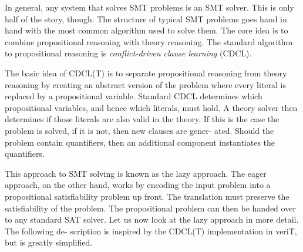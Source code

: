 In general, any system that solves SMT problems is an SMT solver. This is only half of the story, though.
The structure of typical SMT problems goes hand in hand with the most common algorithm used to solve them.
The core idea is to combine propositional reasoning with theory reasoning.
The standard algorithm to propositional reasoning is \textit{conflict-driven clause learning} (CDCL).


The basic idea of CDCL(T) is to separate propositional reasoning from
theory reasoning by creating an abstract version of the problem where every
literal is replaced by a propositional variable. Standard CDCL determines
which propositional variables, and hence which literals, must hold. A theory
solver then determines if those literals are also valid in the theory. If this
is the case the problem is solved, if it is not, then new clauses are gener-
ated. Should the problem contain quantifiers, then an additional component
instantiates the quantifiers.


This approach to SMT solving is known as the lazy approach. The eager
approach, on the other hand, works by encoding the input problem into a
propositional satisfiability problem up front. The translation must preserve
the satisfiability of the problem. The propositional problem can then be
handed over to any standard SAT solver.
Let us now look at the lazy approach in more detail. The following de-
scription is inspired by the CDCL(T) implementation in veriT, but is greatly
simplified.

